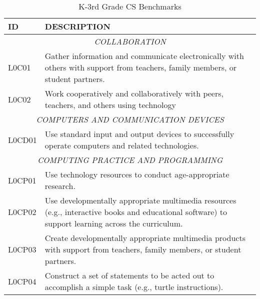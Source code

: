 \begin{longtable}{p{1.8cm}p{11cm}}
\caption{K-3rd Grade CS Benchmarks} \\
\textbf{ID} & \textbf{DESCRIPTION} \\ \hline
\multicolumn{2}{c}{\textit{COLLABORATION}} \\
 L0C01   & Gather information and communicate electronically with others with support from teachers, family members, or student partners.                                                                                             \\
 L0C02   & Work cooperatively and collaboratively with peers, teachers, and others using technology                                                                                                                                   \\
 \multicolumn{2}{c}{\textit{COMPUTERS AND COMMUNICATION DEVICES}}                                                     \\
 L0CD01  & Use standard input and output devices to successfully operate computers and related technologies.                                                                                                                          \\
 \multicolumn{2}{c}{\textit{COMPUTING PRACTICE AND PROGRAMMING}}                                                                                                                                                                                     \\
 L0CP01  & Use technology resources to conduct age-appropriate research.                                                                                                                                                              \\
 L0CP02  & Use developmentally appropriate multimedia resources (e.g., interactive books and educational software) to support learning across the curriculum.                                                                         \\
 L0CP03  & Create developmentally appropriate multimedia products with support from teachers, family members, or student partners.                                                                                                    \\
 L0CP04  & Construct a set of statements to be acted out to accomplish a simple task (e.g., turtle instructions).                                                                                                                     \\

\end{longtable}
